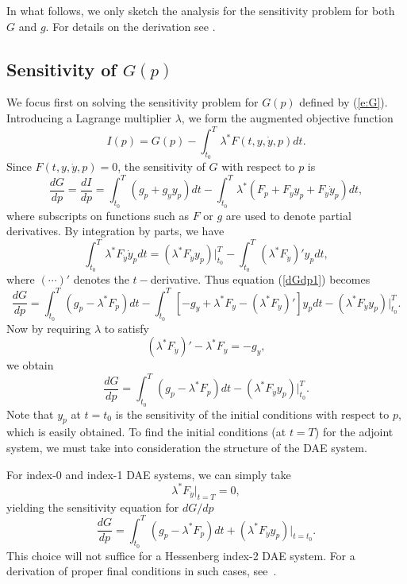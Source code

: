 In what follows, we only sketch the analysis for the sensitivity problem for both $G$ and $g$.
For details on the derivation see \cite{CLPS:03}.

\subsection{Sensitivity of $G(p)$}

We focus first on solving the sensitivity problem for $G(p)$ defined by
(\ref{e:G}).
Introducing a Lagrange multiplier $\lambda$, we form the augmented objective function
$$
I(p) = G(p) - \int_{t_0}^T \lambda^*F(t, y,\dot y, p) dt.
$$
Since $F(t, y,\dot y, p)=0$, the sensitivity of $G$ with respect to $p$ is
\begin{equation}\label{dGdp1}
\frac{dG}{dp} = \frac{dI}{dp} 
=\int_{t_0}^T(g_p + g_yy_p)dt - \int_{t_0}^T \lambda^*( F_p + F_yy_p +
F_{\dot{y}}\dot{y}_p)dt,
\end{equation}
where subscripts on functions such as $F$ or $g$ are used to denote partial derivatives.
By integration by parts, we have 
$$
  \int_{t_0}^T \lambda^* F_{\dot{y}} \dot{y}_p dt = 
  (\lambda^* F_{\dot{y}}y_p) |_{t_0}^{T} 
  - \int_{t_0}^T (\lambda^* F_{\dot{y}})' y_p dt ,
$$
where $(\cdots)'$ denotes the $t-$derivative.
Thus equation (\ref{dGdp1}) becomes 
\begin{equation}
\frac{dG}{dp} = \int_{t_0}^T \left(g_p - \lambda^*F_p \right) dt -  
    \int_{t_0}^T \left[-g_y + \lambda^*F_y - (\lambda^*F_{\dot y})'\right]y_p dt
     - (\lambda^* F_{\dot{y}} y_p) |_{t_0}^{T}.
\end{equation}
Now by requiring $\lambda$ to satisfy
\begin{equation}\label{e:adj_eqns} 
(\lambda^*F_{\dot{y}})' - \lambda^*F_y = -g_y ,
\end{equation}
we obtain  
\begin{equation}\label{e:dGdp}
\frac{dG}{dp} = \int_{t_0}^T \left(
  g_p - \lambda^*F_p \right) dt 
- (\lambda^* F_{\dot{y}}y_p)|_{t_0}^T . 
\end{equation}
Note that $y_p$ at $t=t_0$ is the sensitivity of the initial conditions
with respect to $p$, which is easily obtained.  To find the initial conditions
(at $t = T$) for the adjoint system, we must take into consideration
the structure of the DAE system.

For index-0 and index-1 DAE systems, we can simply take 
\begin{equation}
\lambda^*F_{\dot y}|_{t=T} = 0,
\label{ad-init1}
\end{equation} 
yielding the sensitivity equation for ${dG}/{dp}$
\begin{equation}
\frac{dG}{dp} = \int_{t_0}^T \left(
  g_p - \lambda^*F_p \right) dt 
+ (\lambda^* F_{\dot{y}}y_p)|_{t=t_0} . 
\label{sensi12}
\end{equation}
This choice will not suffice for a Hessenberg index-2 DAE system. For a derivation
of proper final conditions in such cases, see~\cite{CLPS:03}.

